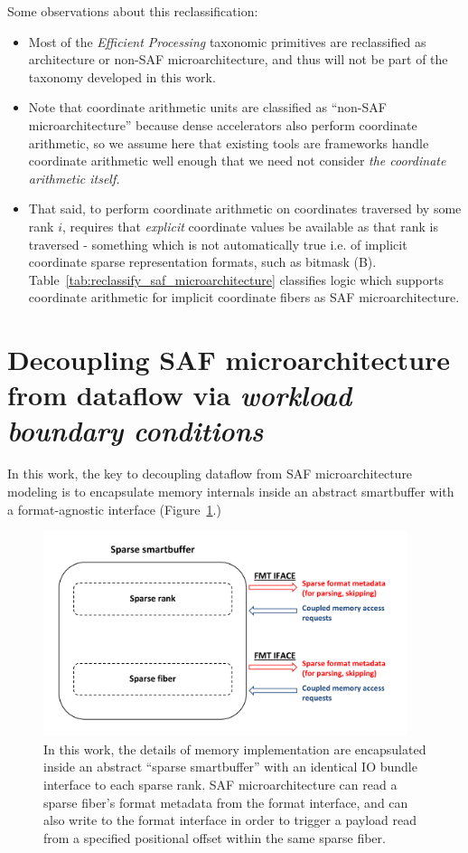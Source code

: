 Some observations about this reclassification:
\begin{itemize}
    \item Most of the \textit{Efficient Processing} taxonomic primitives are reclassified as architecture or non-SAF microarchitecture, and thus will not be part of the taxonomy developed in this work.
    \item Note that coordinate arithmetic units are classified as ``non-SAF microarchitecture'' because dense accelerators also perform coordinate arithmetic, so we assume here that existing tools are frameworks handle coordinate arithmetic well enough that we need not consider \textit{the coordinate arithmetic itself.}
    \item That said, to perform coordinate arithmetic on coordinates traversed by some rank $i$, requires that \textit{explicit}\cite{szebook} coordinate values be available as that rank is traversed - something which is not automatically true i.e. of implicit coordinate sparse representation formats, such as bitmask (B)\cite{szebook}. Table~\ref{tab:reclassify_saf_microarchitecture} classifies logic which supports coordinate arithmetic for implicit coordinate fibers as SAF microarchitecture.
\end{itemize}

\section{Decoupling SAF microarchitecture from dataflow via \textit{workload boundary conditions}}

In this work, the key to decoupling dataflow from SAF microarchitecture modeling is to encapsulate memory internals inside an abstract smartbuffer with a format-agnostic interface (Figure~\ref{fig:sparse_sbuff_overview}.) 

\begin{figure}[ht]
    \centering
    \includegraphics[width=0.95\textwidth]{figures/sparse_sbuff_overview.pdf}
    \caption{In this work, the details of memory implementation are encapsulated inside an abstract ``sparse smartbuffer'' with an identical IO bundle interface to each sparse rank. SAF microarchitecture can read a sparse fiber's format metadata from the format interface, and can also write to the format interface in order to trigger a payload read from a specified positional offset within the same sparse fiber.}
    \label{fig:sparse_sbuff_overview}
\end{figure}


